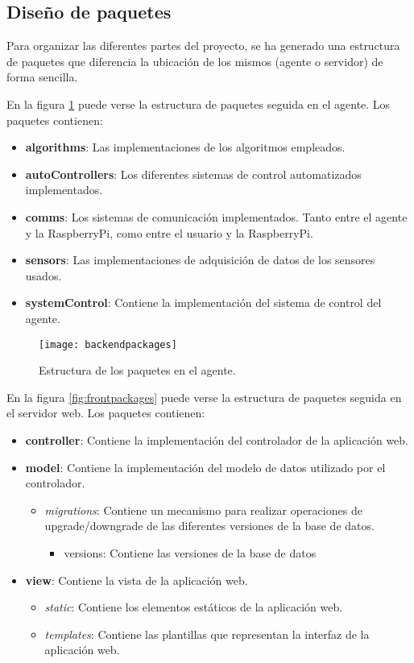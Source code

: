 \subsection{Diseño de paquetes}

Para organizar las diferentes partes del proyecto, se ha generado una estructura de paquetes que diferencia la ubicación de los mismos (agente o servidor) de forma sencilla.

En la figura \ref{fig:backpackages} puede verse la estructura de paquetes seguida en el agente. Los paquetes contienen: 
\begin{itemize}
\item \textbf{algorithms}: Las implementaciones de los algoritmos empleados. 
\item \textbf{autoControllers}: Los diferentes sistemas de control automatizados implementados. 
\item \textbf{comms}: Los sistemas de comunicación implementados. Tanto entre el agente y la RaspberryPi, como entre el usuario y la RaspberryPi.
\item \textbf{sensors}: Las implementaciones de adquisición de datos de los sensores usados.
\item \textbf{systemControl}: Contiene la implementación del sistema de control del agente.
\end{itemize}

\begin{figure}[H]
	\centering
	\texttt{[image: backendpackages]}
	\caption[Estructura de paquetes en agente]{Estructura de los paquetes en el agente.}\label{fig:backpackages}
\end{figure}

En la figura \ref{fig:frontpackages} puede verse la estructura de paquetes seguida en el servidor web. Los paquetes contienen: 
\begin{itemize}
\item \textbf{controller}: Contiene la implementación del controlador de la aplicación web.
\item \textbf{model}: Contiene la implementación del modelo de datos utilizado por el controlador.
\begin{itemize}
\item \textit{migrations}: Contiene un mecanismo para realizar operaciones de upgrade/downgrade de las diferentes versiones de la base de datos.
\begin{itemize}
\item versions: Contiene las versiones de la base de datos
\end{itemize}
\end{itemize}
\item \textbf{view}: Contiene la vista de la aplicación web.
\begin{itemize}
\item \textit{static}: Contiene los elementos estáticos de la aplicación web.
\item \textit{templates}: Contiene las plantillas que representan la interfaz de la aplicación web.
\end{itemize}
\end{itemize}

